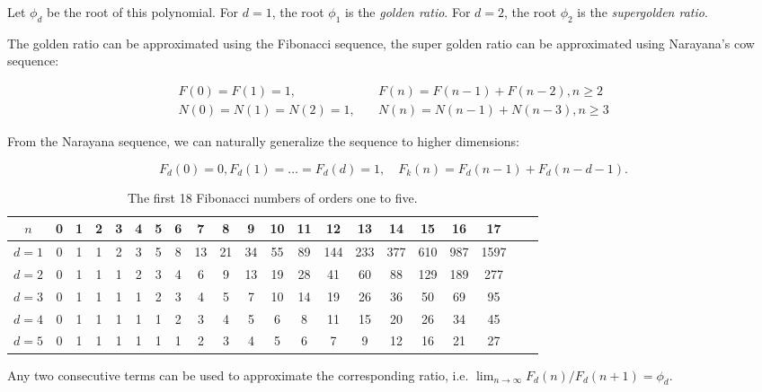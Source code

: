 \documentclass[english,version-2020-11]{uzl-thesis}
\begin{document}
Let $\phi_d$ be the root of this polynomial.
For $d = 1$, the root $\phi_1$ is the \emph{golden ratio}.
For $d = 2$, the root $\phi_2$ is the \emph{supergolden ratio}.

The golden ratio can be approximated using the Fibonacci sequence,
the super golden ratio can be approximated using Narayana's cow sequence:

\begin{align*}
  F(0) = F(1) = 1,        & \quad F(n) = F(n - 1) + F(n - 2), n \ge 2 \\
  N(0) = N(1) = N(2) = 1, & \quad N(n) = N(n - 1) + N(n - 3), n \ge 3
\end{align*}

From the Narayana sequence, we can naturally generalize the sequence to higher dimensions:

\[
  F_d(0) = 0, F_d(1) = \dots = F_d(d) = 1, \quad F_k(n) = F_d(n - 1) + F_d(n - d - 1).
\]

\begin{table}[t]
  \caption{The first 18 Fibonacci numbers of orders one to five.}
  \begin{tabular}{c|cccccccccccccccccccc}
    $n$     & 0 & 1 & 2 & 3 & 4 & 5 & 6 & 7  & 8  & 9  & 10 & 11 & 12  & 13  & 14  & 15  & 16  & 17   \\ %
    \hline
    $d = 1$ & 0 & 1 & 1 & 2 & 3 & 5 & 8 & 13 & 21 & 34 & 55 & 89 & 144 & 233 & 377 & 610 & 987 & 1597 \\ %
    $d = 2$ & 0 & 1 & 1 & 1 & 2 & 3 & 4 & 6  & 9  & 13 & 19 & 28 & 41  & 60  & 88  & 129 & 189 & 277  \\ %
    $d = 3$ & 0 & 1 & 1 & 1 & 1 & 2 & 3 & 4  & 5  & 7  & 10 & 14 & 19  & 26  & 36  & 50  & 69  & 95   \\ %
    $d = 4$ & 0 & 1 & 1 & 1 & 1 & 1 & 2 & 3  & 4  & 5  & 6  & 8  & 11  & 15  & 20  & 26  & 34  & 45   \\ %
    $d = 5$ & 0 & 1 & 1 & 1 & 1 & 1 & 1 & 2  & 3  & 4  & 5  & 6  & 7   & 9   & 12  & 16  & 21  & 27   \\ %
  \end{tabular}
\end{table}

Any two consecutive terms can be used to approximate the corresponding ratio, i.e. $\lim_{n \to \infty} F_d(n) / F_d(n + 1) = \phi_d$.
\end{document}
